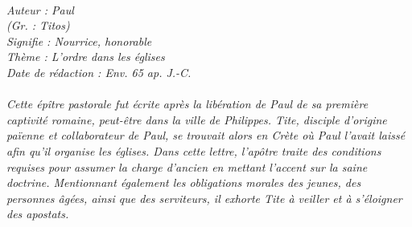 \BFont
\noindent\hrulefill
{\footnotesize
\textit{
\bigskip
{\centering{}
\\Auteur : Paul
\\(Gr. : Titos)
\\Signifie : Nourrice, honorable
\\Thème : L'ordre dans les églises
\\Date de rédaction : Env. 65 ap. J.-C.\\}
}
\textit{
\\Cette épître pastorale fut écrite après la libération de Paul de sa première captivité romaine, peut-être dans la ville de Philippes. Tite, disciple d'origine païenne et collaborateur de Paul, se trouvait alors en Crète où Paul l'avait laissé afin qu'il organise les églises. Dans cette lettre, l'apôtre traite des conditions requises pour assumer la charge d'ancien en mettant l'accent sur la saine doctrine. Mentionnant également les obligations morales des jeunes, des personnes âgées, ainsi que des serviteurs, il exhorte Tite à veiller et à s'éloigner des apostats.\bigskip
}
}
\par\nobreak\noindent\hrulefill
